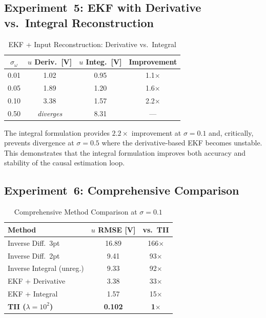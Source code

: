 \documentclass[lettersize,journal]{IEEEtran}
\begin{document}
\subsection{Experiment~5: EKF with Derivative vs.\ Integral Reconstruction}

\begin{table}[!t]
\centering
\caption{EKF + Input Reconstruction: Derivative vs.\ Integral}
\label{tab:ekf}
\begin{tabular}{cccc}
\toprule
$\sigma_\omega$ & $u$ Deriv.\ [V] & $u$ Integ.\ [V] & Improvement \\
\midrule
0.01 & 1.02 & 0.95 & 1.1$\times$ \\
0.05 & 1.89 & 1.20 & 1.6$\times$ \\
0.10 & 3.38 & 1.57 & 2.2$\times$ \\
0.50 & \textit{diverges} & 8.31 & --- \\
\bottomrule
\end{tabular}
\end{table}

The integral formulation provides $2.2\times$ improvement at $\sigma = 0.1$ and, critically, prevents divergence at $\sigma = 0.5$ where the derivative-based EKF becomes unstable. This demonstrates that the integral formulation improves both accuracy and stability of the causal estimation loop.

\subsection{Experiment~6: Comprehensive Comparison}

\begin{table}[!t]
\centering
\caption{Comprehensive Method Comparison at $\sigma = 0.1$}
\label{tab:comparison}
\begin{tabular}{lcc}
\toprule
Method & $u$ RMSE [V] & vs.\ TII \\
\midrule
Inverse Diff.\ 3pt        & 16.89 & 166$\times$ \\
Inverse Diff.\ 2pt        &  9.41 &  93$\times$ \\
Inverse Integral (unreg.)  &  9.33 &  92$\times$ \\
EKF + Derivative           &  3.38 &  33$\times$ \\
EKF + Integral             &  1.57 &  15$\times$ \\
\textbf{TII ($\lambda = 10^2$)} & \textbf{0.102} & \textbf{1$\times$} \\
\bottomrule
\end{tabular}
\end{table}
\end{document}
